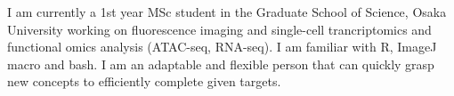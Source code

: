 

\begin{cvparagraph}

I am currently a 1st year MSc student in the Graduate School of Science, Osaka University working on fluorescence imaging and single-cell trancriptomics and functional omics analysis (ATAC-seq, RNA-seq). I am familiar with R, ImageJ macro and bash. I am an adaptable and flexible person that can quickly grasp new concepts to efficiently complete given targets. 
\end{cvparagraph}
